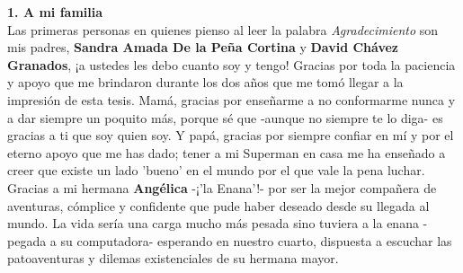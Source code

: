 \documentclass[
12pt, %
spanish, %
onehalfspacing, %
headsepline, %
]{MastersDoctoralThesis} %
\begin{document}
\begin{acknowledgements}
\addchaptertocentry{\acknowledgementname} %

\textbf{1. A mi familia}\\

Las primeras personas en quienes pienso al leer la palabra \textit{Agradecimiento} son mis padres, \textbf{Sandra Amada De la Peña Cortina} y \textbf{David Chávez Granados}, ¡a ustedes les debo cuanto soy y tengo! Gracias por toda la paciencia y apoyo que me brindaron durante los dos años que me tomó llegar a la impresión de esta tesis. Mamá, gracias por enseñarme a no conformarme nunca y a dar siempre un poquito más, porque sé que -aunque no siempre te lo diga- es gracias a ti que soy quien soy. Y papá, gracias por siempre confiar en mí y por el eterno apoyo que me has dado; tener a mi Superman en casa me ha enseñado a creer que existe un lado 'bueno' en el mundo por el que vale la pena luchar. \\

Gracias a mi hermana \textbf{Angélica} -¡'la Enana'!- por ser la mejor compañera de aventuras, cómplice y confidente que pude haber deseado desde su llegada al mundo. La vida sería una carga mucho más pesada sino tuviera a la enana -pegada a su computadora- esperando en nuestro cuarto, dispuesta a escuchar las patoaventuras y dilemas existenciales de su hermana mayor.\\





\end{acknowledgements}
\end{document}
